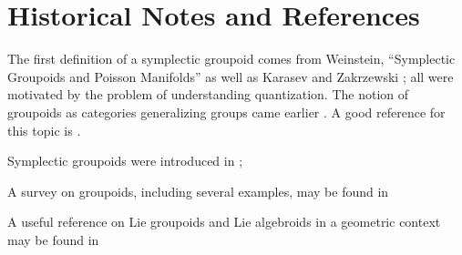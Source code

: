 \documentclass{tufte-handout}
\begin{document}
\section{Historical Notes and References}
The first definition of a symplectic groupoid comes from Weinstein, ``Symplectic Groupoids and Poisson Manifolds'' \cite{weinstein87} as well as Karasev \cite{} and Zakrzewski \cite{}; all were motivated by the problem of understanding quantization. The notion of groupoids as categories generalizing groups came earlier \cite{SOMETHING HERE}. A good reference for this topic is \cite{}. %

Symplectic groupoids were introduced in \cite{weinstein87}; %

A survey on groupoids, including several examples, may be found in \cite{weinstein1996} %

A useful reference on Lie groupoids and Lie algebroids in a geometric context may be found in \cite{mackenzie1987}


\end{document}
